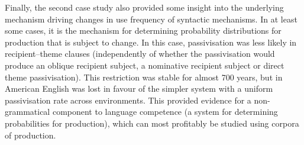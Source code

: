 	Finally, the second case study also provided some insight into the underlying mechanism driving changes in use frequency of syntactic mechanisms. In at least some cases, it is the mechanism for determining probability distributions for production that is subject to change. In this case, passivisation was less likely in recipient--theme clauses (independently of whether the passivisation would produce an oblique recipient subject, a nominative recipient subject or direct theme passivisation). This restriction was stable for almost 700 years, but in American English was lost in favour of the simpler system with a uniform passivisation rate across environments. This provided evidence for a non-grammatical component to language competence (a system for determining probabilities for production), which can most profitably be studied using corpora of production.

%
